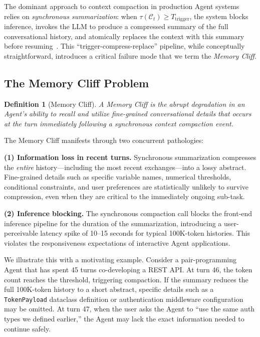 \documentclass[10pt,twocolumn]{article}
\newtheorem{definition}{Definition}
\newcommand{\Dtok}{\tau}
\newcommand{\Ttrig}{T_{\mathrm{trigger}}}
\begin{document}
The dominant approach to context compaction in production Agent systems relies on \emph{synchronous summarization}: when $\Dtok(\mathcal{C}_t) \geq \Ttrig$, the system blocks inference, invokes the LLM to produce a compressed summary of the full conversational history, and atomically replaces the context with this summary before resuming~\cite{chase2022langchain, packer2023memgpt}. This ``trigger-compress-replace'' pipeline, while conceptually straightforward, introduces a critical failure mode that we term the \emph{Memory Cliff}.

\subsection{The Memory Cliff Problem}\label{sec:cliff_problem}

\begin{definition}[Memory Cliff]\label{def:cliff}
  A \emph{Memory Cliff} is the abrupt degradation in an Agent's ability to recall and utilize fine-grained conversational details that occurs at the turn immediately following a synchronous context compaction event.
\end{definition}

The Memory Cliff manifests through two concurrent pathologies:

\textbf{(1) Information loss in recent turns.} Synchronous summarization compresses the \emph{entire} history---including the most recent exchanges---into a lossy abstract. Fine-grained details such as specific variable names, numerical thresholds, conditional constraints, and user preferences are statistically unlikely to survive compression, even when they are critical to the immediately ongoing sub-task.

\textbf{(2) Inference blocking.} The synchronous compaction call blocks the front-end inference pipeline for the duration of the summarization, introducing a user-perceivable latency spike of 10--15 seconds for typical 100K-token histories. This violates the responsiveness expectations of interactive Agent applications.

We illustrate this with a motivating example. Consider a pair-programming Agent that has spent 45 turns co-developing a REST API. At turn 46, the token count reaches the threshold, triggering compaction. If the summary reduces the full 100K-token history to a short abstract, specific details such as a \texttt{TokenPayload} dataclass definition or authentication middleware configuration may be omitted. At turn 47, when the user asks the Agent to ``use the same auth types we defined earlier,'' the Agent may lack the exact information needed to continue safely.
\end{document}

